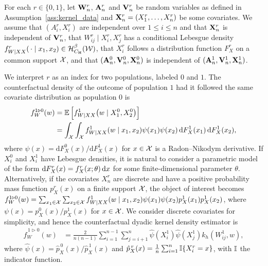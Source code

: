For each $r \in \{0,1\}$, let $\mathbf{W}_n^r$, $\mathbf{A}_n^r$ and $\mathbf{V}_n^r$ be random
variables as defined in Assumption~\ref{ass:kernel_data} and
$\mathbf{X}_n^r = (X_1^r, \ldots, X_n^r)$ be some covariates.
We assume that $(A_i^r, X_i^r)$ are independent over $1 \leq i \leq n$
and that $\mathbf{X}_n^r$ is independent of $\mathbf{V}_n^r$, that
$W_{i j}^r \mid X_i^r, X_j^r$ has a conditional Lebesgue density
$f_{W \mid XX}^r(\,\cdot \mid x_1, x_2) \in \mathcal{H}^\beta_{C_{\mathrm{H}}}(\mathcal{W})$,
that $X_i^r$ follows a distribution function $F_X^r$ on a common support $\mathcal{X}$,
and that $(\mathbf{A}_n^0, \mathbf{V}_n^0, \mathbf{X}_n^0)$
is independent of $(\mathbf{A}_n^1, \mathbf{V}_n^1, \mathbf{X}_n^1)$.

We interpret $r$ as an index for two populations, labeled $0$ and $1$. The
counterfactual density of the outcome of population $1$ had it followed the
same covariate distribution as population $0$ is
%
\begin{align*}
  f_W^{1 \triangleright 0}(w)
  &= \mathbb{E}\left[ f_{W \mid XX}^1\big(w \mid X_1^0, X_2^0\big) \right] \\
  &= \int_{\mathcal{X}} \int_{\mathcal{X}} f_{W \mid XX}^{1}(w \mid x_1, x_2)
  \psi(x_1) \psi(x_2) \,\mathrm{d}F_X^{1}(x_1) \,\mathrm{d}F_X^{1}(x_2),
\end{align*}
%
where $\psi(x) = \mathrm{d} F_X^0(x) / \mathrm{d} F_X^1(x)$ for $x \in \mathcal{X}$
is a Radon--Nikodym derivative. If $X^0_i$ and $X^1_i$ have Lebesgue densities,
it is natural to consider a parametric model of the form
$\mathrm{d} F_X^{r}(x)=f_X^r(x;\theta)\,\mathrm{d}x$
for some finite-dimensional parameter $\theta$.
Alternatively, if the covariates $X_n^r$ are discrete and have a positive
probability mass function $p_X^r(x)$ on a finite
support $\mathcal{X}$, the object of interest becomes
$f_W^{1 \triangleright 0}(w)
= \sum_{x_1 \in \mathcal{X}} \sum_{x_2 \in \mathcal{X}}
f_{W \mid XX}^{1}(w \mid x_1, x_2) \psi(x_1) \psi(x_2)
p_X^{1}(x_1) p_X^{1}(x_2)$,
where $\psi(x) = p_X^0(x)/p_X^1(x)$ for $x \in \mathcal{X}$.
We consider discrete covariates for simplicity,
and hence the counterfactual dyadic kernel density estimator is
%
\begin{align*}
  \hat f_W^{\,1 \triangleright 0}(w)
  &= \frac{2}{n(n-1)} \sum_{i=1}^{n-1} \sum_{j=i+1}^n
  \hat \psi(X_i^1) \hat \psi(X_j^1) k_h(W_{i j}^1, w),
\end{align*}
%
where $\hat\psi(x) = \hat p_X^{\,0}(x) / \hat p_X^{\,1}(x)$ and
$\hat p_X^{\,r}(x) = \frac{1}{n}\sum_{i = 1}^n \mathbb{I}\{X_i^r = x\}$,
with $\mathbb{I}$ the indicator function.

